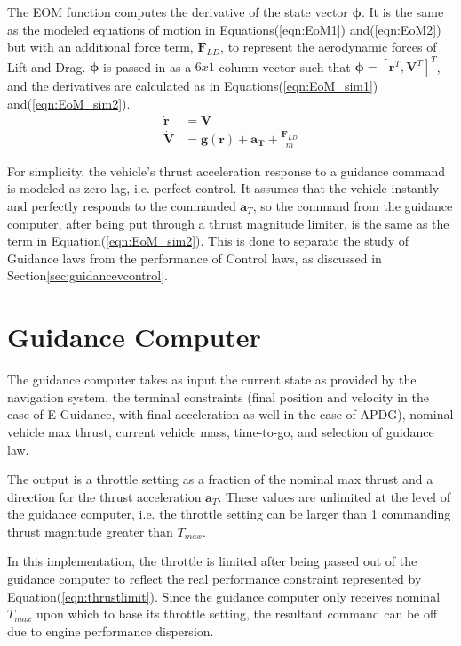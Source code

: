 The EOM function computes the derivative of the state vector $\bm{\phi}$. It is the same as the modeled equations of motion in Equations\:(\ref{eqn:EoM1}) and\:(\ref{eqn:EoM2}) but with an additional force term, $\bm{F}_{LD}$, to represent the aerodynamic forces of Lift and Drag. $\bm{\phi}$ is passed in as a $6x1$ column vector such that $\bm{\phi} = [\bm{r}^T,\bm{V}^T]^T$, and the derivatives are calculated as in Equations\:(\ref{eqn:EoM_sim1}) and\:(\ref{eqn:EoM_sim2}).
\begin{align}
\label{eqn:EoM_sim1}
\bm{\dot{r}} &= \bm{V}\\
\label{eqn:EoM_sim2}
\bm{\dot{V}} &= \bm{g(r)} + \bm{a_T} + \frac{\bm{F}_{LD}}{m}
\end{align}

For simplicity, the vehicle's thrust acceleration response to a guidance command is modeled as zero-lag, i.e. perfect control. It assumes that the vehicle instantly and perfectly responds to the commanded $\bm{a}_T$, so the command from the guidance computer, after being put through a thrust magnitude limiter, is the same as the term in Equation\:(\ref{eqn:EoM_sim2}). This is done to separate the study of Guidance laws from the performance of Control laws, as discussed in Section\:\ref{sec:guidancevcontrol}.

\section{Guidance Computer} \label{sec:guidancecomp}
The guidance computer takes as input the current state as provided by the navigation system, the terminal constraints (final position and velocity in the case of E-Guidance, with final acceleration as well in the case of APDG), nominal vehicle max thrust, current vehicle mass, time-to-go, and selection of guidance law.

The output is a throttle setting as a fraction of the nominal max thrust and a direction for the thrust acceleration $\bm{a}_T$. These values are unlimited at the level of the guidance computer, i.e. the throttle setting can be larger than 1 commanding thrust magnitude greater than $T_{max}$. 

In this implementation, the throttle is limited after being passed out of the guidance computer to reflect the real performance constraint represented by Equation\:(\ref{eqn:thrustlimit}). Since the guidance computer only receives nominal $T_{max}$ upon which to base its throttle setting, the resultant command can be off due to engine performance dispersion.

